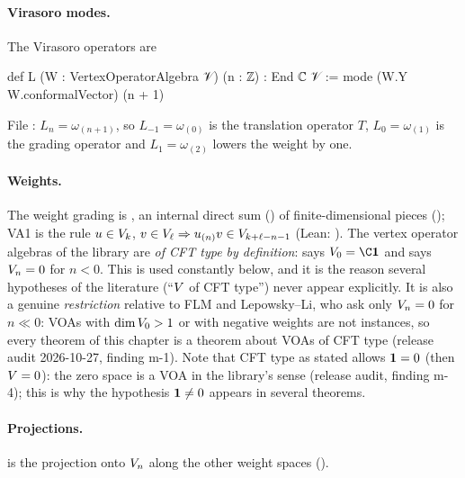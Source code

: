 \paragraph{Virasoro modes.} The Virasoro operators are
\begin{leancode}
def L (W : VertexOperatorAlgebra 𝒱) (n : ℤ) : End ℂ 𝒱 :=
  mode (W.Y W.conformalVector) (n + 1)
\end{leancode}
File : $L_n = \omega_{(n+1)}$, so
$L_{-1} = \omega_{(0)}$ is the translation operator $T$, $L_0 = \omega_{(1)}$ is the grading
operator and $L_1 = \omega_{(2)}$ lowers the weight by one.

\paragraph{Weights.} The weight grading is , an internal
direct sum () of finite-dimensional pieces (); VA1 is the rule
$u\in V_k$, $v\in V_\ell\Rightarrow u_{(n)}v\in V_{k+\ell-n-1}$ (Lean:
\allowbreak{}\allowbreak{}). The vertex operator algebras of the library are \emph{of CFT type by
definition}:  says $\lfourV_0 = \C\lfourvac$ and  says
$V_n = 0$ for $n<0$. This is used constantly below, and it is the reason several
hypotheses of the literature (``$V$ of CFT type'') never appear explicitly. It is also a genuine
\emph{restriction} relative to FLM and Lepowsky--Li, who ask only $V_n = 0$ for $n\ll0$: VOAs with
$\dim V_0>1$ or with negative weights are not instances, so every theorem of this chapter is a theorem about
VOAs of CFT type (release audit 2026-10-27, finding m-1). Note that CFT
type as stated allows $\mathbf{1} = 0$ (then $V = 0$): the zero space is a VOA in the library's sense (release
audit, finding m-4); this is why the hypothesis $\mathbf{1}\ne0$ appears in several theorems.

\paragraph{Projections.}  is the projection onto $V_n$ along
the other weight spaces ().

